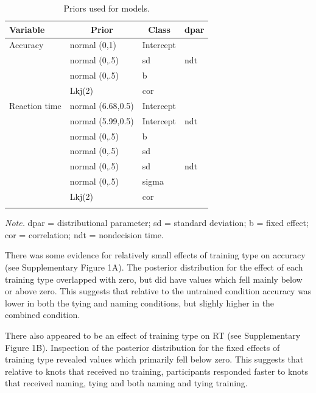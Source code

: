 \documentclass[
  man,floatsintext]{apa6}
\begin{document}
\begin{table}[tbp]

\begin{center}
\begin{threeparttable}

\caption{\label{tab:prior-table}Priors used for models.}

\begin{tabular}{llll}
\toprule
Variable & \multicolumn{1}{c}{Prior} & \multicolumn{1}{c}{Class} & \multicolumn{1}{c}{dpar}\\
\midrule
Accuracy & normal (0,1) & Intercept & \\
 & normal (0,.5) & sd & ndt\\
 & normal (0,.5) & b & \\
 & Lkj(2) & cor & \\
Reaction time & normal (6.68,0.5) & Intercept & \\
 & normal (5.99,0.5) & Intercept & ndt\\
 & normal (0,.5) & b & \\
 & normal (0,.5) & sd & \\
 & normal (0,.5) & sd & ndt\\
 & normal (0,.5) & sigma & \\
 & Lkj(2) & cor & \\
\bottomrule
\addlinespace
\end{tabular}

\begin{tablenotes}[para]
\normalsize{\textit{Note.} dpar = distributional parameter; sd = standard deviation; b = fixed effect; cor = correlation; ndt = nondecision time.}
\end{tablenotes}

\end{threeparttable}
\end{center}

\end{table}

There was some evidence for relatively small effects of training type on accuracy (see Supplementary Figure 1A). The posterior distribution for the effect of each training type overlapped with zero, but did have values which fell mainly below or above zero. This suggests that relative to the untrained condition accuracy was lower in both the tying and naming conditions, but slighly higher in the combined condition.

There also appeared to be an effect of training type on RT (see Supplementary Figure 1B). Inspection of the posterior distribution for the fixed effects of training type revealed values which primarily fell below zero. This suggests that relative to knots that received no training, participants responded faster to knots that received naming, tying and both naming and tying training.
\end{document}
